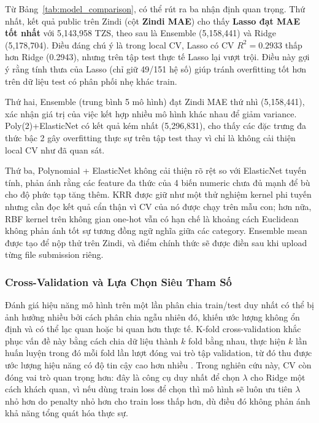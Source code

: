 Từ Bảng~\ref{tab:model_comparison}, có thể rút ra ba nhận định quan trọng. Thứ nhất, kết quả public trên Zindi (cột \textbf{Zindi MAE}) cho thấy \textbf{Lasso đạt MAE tốt nhất} với 5{,}143{,}958 TZS, theo sau là Ensemble (5{,}158{,}441) và Ridge (5{,}178{,}704). Điều đáng chú ý là trong local CV, Lasso có CV $R^2 = 0.2933$ thấp hơn Ridge (0.2943), nhưng trên tập test thực tế Lasso lại vượt trội. Điều này gợi ý rằng tính thưa của Lasso (chỉ giữ 49/151 hệ số) giúp tránh overfitting tốt hơn trên dữ liệu test có phân phối nhẹ khác train.

Thứ hai, Ensemble (trung bình 5 mô hình) đạt Zindi MAE thứ nhì (5{,}158{,}441), xác nhận giá trị của việc kết hợp nhiều mô hình khác nhau để giảm variance. Poly(2)+ElasticNet có kết quả kém nhất (5{,}296{,}831), cho thấy các đặc trưng đa thức bậc 2 gây overfitting thực sự trên tập test thay vì chỉ là không cải thiện local CV như đã quan sát.

Thứ ba, Polynomial + ElasticNet không cải thiện rõ rệt so với ElasticNet tuyến tính, phản ánh rằng các feature đa thức của 4 biến numeric chưa đủ mạnh để bù cho độ phức tạp tăng thêm. KRR được giữ như một thử nghiệm kernel phi tuyến nhưng cần đọc kết quả cẩn thận vì CV của nó được chạy trên mẫu con; hơn nữa, RBF kernel trên không gian one-hot vẫn có hạn chế là khoảng cách Euclidean không phản ánh tốt sự tương đồng ngữ nghĩa giữa các category. Ensemble mean được tạo để nộp thử trên Zindi, và điểm chính thức sẽ được điền sau khi upload từng file submission riêng.

\subsubsection{Cross-Validation và Lựa Chọn Siêu Tham Số}
\label{subsec:cv}

Đánh giá hiệu năng mô hình trên một lần phân chia train/test duy nhất có thể bị ảnh hưởng nhiều bởi cách phân chia ngẫu nhiên đó, khiến ước lượng không ổn định và có thể lạc quan hoặc bi quan hơn thực tế. K-fold cross-validation khắc phục vấn đề này bằng cách chia dữ liệu thành $k$ fold bằng nhau, thực hiện $k$ lần huấn luyện trong đó mỗi fold lần lượt đóng vai trò tập validation, từ đó thu được ước lượng hiệu năng có độ tin cậy cao hơn nhiều \cite{james2013}. Trong nghiên cứu này, CV còn đóng vai trò quan trọng hơn: đây là công cụ duy nhất để chọn $\lambda$ cho Ridge một cách khách quan, vì nếu dùng train loss để chọn thì mô hình sẽ luôn ưu tiên $\lambda$ nhỏ hơn do penalty nhỏ hơn cho train loss thấp hơn, dù điều đó không phản ánh khả năng tổng quát hóa thực sự.

